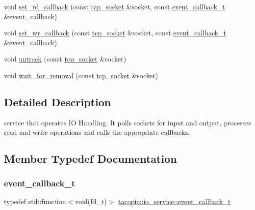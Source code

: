 \begin{DoxyCompactItemize}
\item 
void \hyperlink{classtacopie_1_1io__service_a8094c1fec76c6821cc0c008fe524c89a}{set\+\_\+rd\+\_\+callback} (const \hyperlink{classtacopie_1_1tcp__socket}{tcp\+\_\+socket} \&socket, const \hyperlink{classtacopie_1_1io__service_abb66850c32d9c724f4418d77bd04bcfd}{event\+\_\+callback\+\_\+t} \&event\+\_\+callback)
\item 
void \hyperlink{classtacopie_1_1io__service_a7c4f56c7790c7ba52b09837a42aaffb1}{set\+\_\+wr\+\_\+callback} (const \hyperlink{classtacopie_1_1tcp__socket}{tcp\+\_\+socket} \&socket, const \hyperlink{classtacopie_1_1io__service_abb66850c32d9c724f4418d77bd04bcfd}{event\+\_\+callback\+\_\+t} \&event\+\_\+callback)
\item 
void \hyperlink{classtacopie_1_1io__service_a9a7672f0894a0fc1a3e6c593ca6df22c}{untrack} (const \hyperlink{classtacopie_1_1tcp__socket}{tcp\+\_\+socket} \&socket)
\item 
void \hyperlink{classtacopie_1_1io__service_aa57db619baeaa6db0aeb22e67b895cd7}{wait\+\_\+for\+\_\+removal} (const \hyperlink{classtacopie_1_1tcp__socket}{tcp\+\_\+socket} \&socket)
\end{DoxyCompactItemize}


\subsection{Detailed Description}
service that operates IO Handling. It polls sockets for input and output, processes read and write operations and calls the appropriate callbacks. 

\subsection{Member Typedef Documentation}
\mbox{\label{classtacopie_1_1io__service_abb66850c32d9c724f4418d77bd04bcfd}} 
\subsubsection{\texorpdfstring{event\+\_\+callback\+\_\+t}{event\_callback\_t}}
{\footnotesize\ttfamily typedef std\+::function$<$void(fd\+\_\+t)$>$ \hyperlink{classtacopie_1_1io__service_abb66850c32d9c724f4418d77bd04bcfd}{tacopie\+::io\+\_\+service\+::event\+\_\+callback\+\_\+t}}

